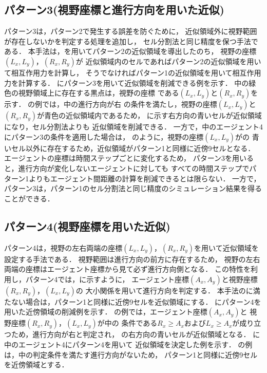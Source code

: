 \subsection{パターン3(視野座標と進行方向を用いた近似)}
パターン3は，パターン2で発生する誤差を防ぐために，
近似領域外に視野範囲が存在しないかを判定する処理を追加し，
セル分割法と同じ精度を保つ手法である\cite{katayose}．
本手法は，を用いてパターン2の近似領域を導出したのち，
視野の座標$(L_x,L_y)$，$(R_x,R_y)$が
近似領域内のセルであればパターン2の近似領域を用いて相互作用力を計算し，
そうでなければパターン1の近似領域を用いて相互作用力を計算する．
にパターン3を用いて近似領域を削減できる例を示す．
中の緑色の視野領域上に存在する黒点は，視野の座標
である$(L_x,L_y)$と$(R_x,R_y)$を示す．
の例では，中の進行方向が右
の条件を満たし，視野の座標$(L_x,L_y)$と$(R_x,R_y)$が青色の近似領域内であるため，
に示す右方向の青いセルが近似領域になり，セル分割法よりも
近似領域を削減できる．
一方で，中のエージェント4にパターン3の条件を適用した場合は，
のように，視野の座標$(L_x,L_y)$がの
青いセル以外に存在するため，近似領域がパターン1と同様に近傍9セルとなる．
エージェントの座標は時間ステップごとに変化するため，
パターン3を用いると，進行方向が変化しないエージェントに対しても
すべての時間ステップでパターン1よりもエージェント間距離の計算を削減できるとは限らない．
一方で，パターン3は，パターン1のセル分割法と同じ精度のシミュレーション結果を得ることができる．



\subsection{パターン4(視野座標を用いた近似)}
パターン4は，視野の左右両端の座標$(L_x,L_y)$，$(R_x,R_y)$を用いて近似領域を設定する手法である．
視野範囲は進行方向の前方に存在するため，
視野の左右両端の座標はエージェント座標から見て必ず進行方向側となる．
この特性を利用し，パターン4では，に示すように，
エージェント座標$(A_x,A_y)$と視野座標$(R_x,R_y)$，$(L_x,L_y)$の
大小関係を用いて進行方向を判定する．
本手法のに満たない場合は，パターン1と同様に近傍9セルを近似領域にする．
にパターン4を用いた近傍領域の削減例を示す．
の例では，エージェント座標$(A_x,A_y)$と
視野座標$(R_x,R_y)$，$(L_x,L_y)$が中の
条件である$R_x \geq A_x$および$L_x \geq A_x$が成り立つため，進行方向が右と判定され，
の右方向の青いセルが近似領域となる．
に中のエージェント4にパターン4を用いて
近似領域を決定した例を示す．
の例は，中の判定条件を満たす進行方向がないため，
パターン1と同様に近傍9セルを近傍領域とする．

